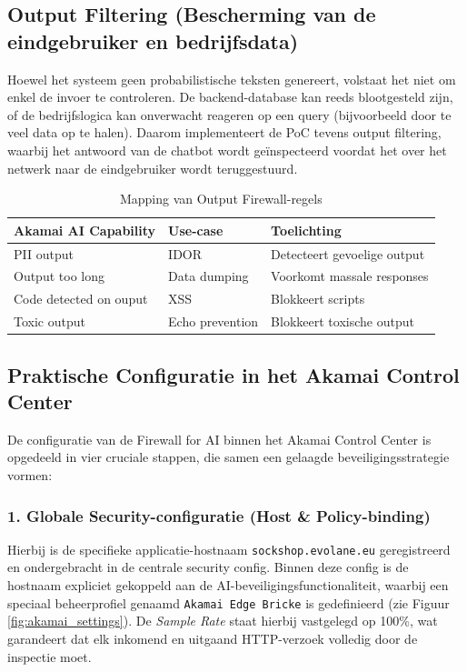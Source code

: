\subsection{Output Filtering (Bescherming van de eindgebruiker en bedrijfsdata)}

Hoewel het systeem geen probabilistische teksten genereert, volstaat het niet om enkel de invoer te controleren. De backend-database kan reeds blootgesteld zijn, of de bedrijfslogica kan onverwacht reageren op een query (bijvoorbeeld door te veel data op te halen). Daarom implementeert de PoC tevens output filtering, waarbij het antwoord van de chatbot wordt geïnspecteerd voordat het over het netwerk naar de eindgebruiker wordt teruggestuurd.

\begin{table}[H]
    \centering
    \caption{Mapping van Output Firewall-regels}
    \begin{tabular}{|p{4cm}|p{4cm}|p{6cm}|}
        \hline
        Akamai AI Capability & Use-case & Toelichting \\
        \hline
        PII output & IDOR & Detecteert gevoelige output \\
        \hline
        Output too long & Data dumping & Voorkomt massale responses \\
        \hline
        Code detected on ouput & XSS & Blokkeert scripts \\
        \hline
        Toxic output & Echo prevention & Blokkeert toxische output \\
        \hline
    \end{tabular}
\end{table}

\subsection{Praktische Configuratie in het Akamai Control Center}

De configuratie van de Firewall for AI binnen het Akamai Control Center is opgedeeld in vier cruciale stappen, die samen een gelaagde beveiligingsstrategie vormen:

\subsubsection*{1. Globale Security-configuratie (Host \& Policy-binding)}
Hierbij is de specifieke applicatie-hostnaam \texttt{sockshop.evolane.eu} geregistreerd en ondergebracht in de centrale security config. Binnen deze config is de hostnaam expliciet gekoppeld aan de AI-beveiligingsfunctionaliteit, waarbij een speciaal beheerprofiel genaamd \texttt{Akamai Edge Bricke} is gedefinieerd (zie Figuur \ref{fig:akamai_settings}). De \textit{Sample Rate} staat hierbij vastgelegd op 100\%, wat garandeert dat elk inkomend en uitgaand HTTP-verzoek volledig door de inspectie moet.

